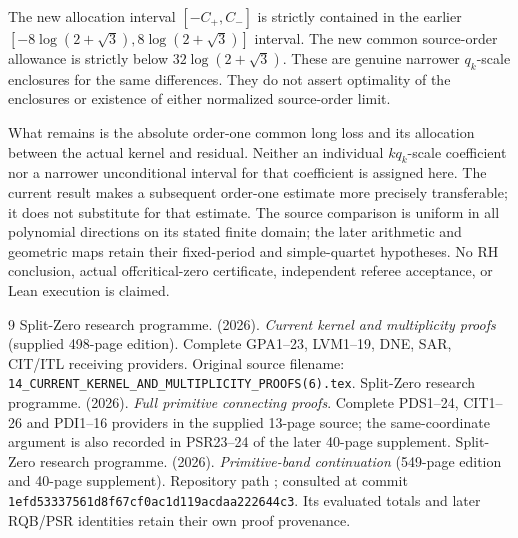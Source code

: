 \documentclass[11pt,a4paper]{article}
\begin{document}
The new allocation interval $[-C_+,C_-]$ is strictly contained in the earlier
$[-8\log(2+\sqrt3),8\log(2+\sqrt3)]$ interval.
The new common source-order allowance is strictly below
$32\log(2+\sqrt3)$. These are genuine narrower $q_k$-scale enclosures for the
same differences. They do not assert optimality of the enclosures or existence
of either normalized source-order limit.

What remains is the absolute order-one common long loss and its allocation
between the actual kernel and residual. Neither an individual $kq_k$-scale
coefficient nor a narrower unconditional interval for that coefficient is
assigned here. The current result makes a subsequent order-one estimate more
precisely transferable; it does not substitute for that estimate.
The source comparison is uniform in all polynomial directions on its stated
finite domain; the later arithmetic and geometric maps retain their fixed-period
and simple-quartet hypotheses. No RH conclusion, actual offcritical-zero
certificate, independent referee acceptance, or Lean execution is claimed.


\endgroup

\begin{thebibliography}{9}
Split-Zero research programme. (2026). \emph{Current kernel and multiplicity proofs} (supplied 498-page edition). Complete GPA1--23, LVM1--19, DNE, SAR, CIT/ITL receiving providers. Original source filename: \texttt{14\_CURRENT\_KERNEL\_AND\_MULTIPLICITY\_PROOFS(6).tex}.
Split-Zero research programme. (2026). \emph{Full primitive connecting proofs}. Complete PDS1--24, CIT1--26 and PDI1--16 providers in the supplied 13-page source; the same-coordinate argument is also recorded in PSR23--24 of the later 40-page supplement.
Split-Zero research programme. (2026). \emph{Primitive-band continuation} (549-page edition and 40-page supplement). Repository path ; consulted at commit \texttt{1efd53337561d8f67cf0ac1d119acdaa222644c3}. Its evaluated totals and later RQB/PSR identities retain their own proof provenance.
\end{thebibliography}
\endgroup

\endgroup


\clearpage
\clearpage
\begingroup
\providecommand{\im}{\operatorname{im}}
\providecommand{\rank}{\operatorname{rank}}
\end{document}
